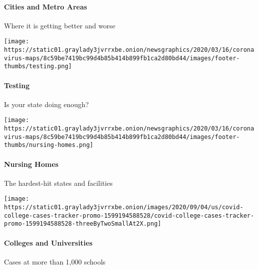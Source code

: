 \hypertarget{cities-and-metro-areas}{%
\paragraph{Cities and Metro Areas}\label{cities-and-metro-areas}}

Where it is getting better and worse

\href{https://www.nytimes3xbfgragh.onion/interactive/2020/us/coronavirus-testing.html}{}

\texttt{[image: https://static01.graylady3jvrrxbe.onion/newsgraphics/2020/03/16/coronavirus-maps/8c59be7419bc99d4b85b414b899fb1ca2d80bd44/images/footer-thumbs/testing.png]}

\hypertarget{testing}{%
\paragraph{Testing}\label{testing}}

Is your state doing enough?

\href{https://www.nytimes3xbfgragh.onion/interactive/2020/us/coronavirus-nursing-homes.html}{}

\texttt{[image: https://static01.graylady3jvrrxbe.onion/newsgraphics/2020/03/16/coronavirus-maps/8c59be7419bc99d4b85b414b899fb1ca2d80bd44/images/footer-thumbs/nursing-homes.png]}

\hypertarget{nursing-homes}{%
\paragraph{Nursing Homes}\label{nursing-homes}}

The hardest-hit states and facilities

\href{https://www.nytimes3xbfgragh.onion/interactive/2020/us/covid-college-cases-tracker.html}{}

\texttt{[image: https://static01.graylady3jvrrxbe.onion/images/2020/09/04/us/covid-college-cases-tracker-promo-1599194588528/covid-college-cases-tracker-promo-1599194588528-threeByTwoSmallAt2X.png]}

\hypertarget{colleges-and-universities}{%
\paragraph{Colleges and Universities}\label{colleges-and-universities}}

Cases at more than 1,000 schools

\href{https://www.nytimes3xbfgragh.onion/interactive/2020/us/states-reopen-map-coronavirus.html}{}


